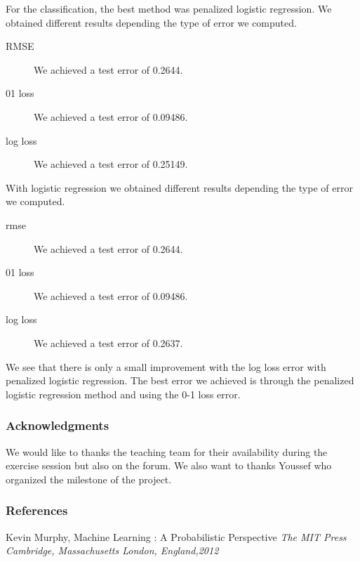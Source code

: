 \documentclass{article} %
\begin{document}
For the classification, the best method was penalized logistic regression. We obtained different results depending the type of error we computed. \begin{description}
\item[RMSE] We achieved a test error of 0.2644.
\item[01 loss]We achieved a test error of 0.09486.
\item[log loss] We achieved a test error of 0.25149.
\end{description}
With logistic regression we obtained different results depending the type of error we computed. \begin{description}
\item[rmse] We achieved a test error of 0.2644.
\item[01 loss]We achieved a test error of 0.09486.
\item[log loss] We achieved a test error of 0.2637.
\end{description}
We see that there is only a small improvement with the log loss error with penalized logistic regression.
The best error we achieved is through the penalized logistic regression method and using the 0-1 loss error.

\subsubsection*{Acknowledgments}
We would like to thanks the teaching team for their availability during the exercise session but also on the forum. We also want to thanks Youssef who organized the milestone of the project.

\subsubsection*{References}
Kevin Murphy, Machine Learning : A Probabilistic Perspective {\em The MIT Press
Cambridge, Massachusetts
London, England,2012} 
\end{document}
